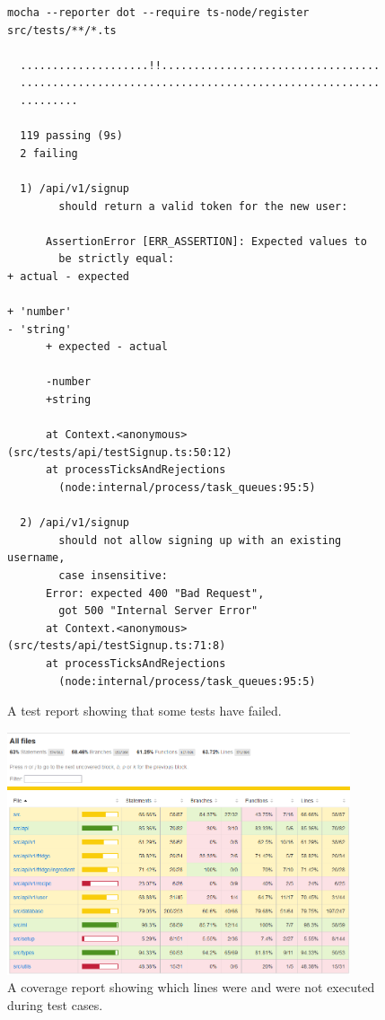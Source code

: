 \begin{figure}
  \centering
  \caption{\label{fig:test_report}A test report showing that some tests have failed.}
  \begin{verbatim}
mocha --reporter dot --require ts-node/register src/tests/**/*.ts

  ....................!!..................................
  ........................................................
  .........

  119 passing (9s)
  2 failing

  1) /api/v1/signup
        should return a valid token for the new user:

      AssertionError [ERR_ASSERTION]: Expected values to
        be strictly equal:
+ actual - expected

+ 'number'
- 'string'
      + expected - actual

      -number
      +string

      at Context.<anonymous> (src/tests/api/testSignup.ts:50:12)
      at processTicksAndRejections
        (node:internal/process/task_queues:95:5)

  2) /api/v1/signup
        should not allow signing up with an existing username,
        case insensitive:
      Error: expected 400 "Bad Request",
        got 500 "Internal Server Error"
      at Context.<anonymous> (src/tests/api/testSignup.ts:71:8)
      at processTicksAndRejections
        (node:internal/process/task_queues:95:5)
  \end{verbatim}
\end{figure}

\begin{figure}
  \centering
  \caption{\label{fig:coverage_report}A coverage report showing which lines were and were not executed during test cases.}
  \includegraphics[width=0.9\textwidth]{figures/coverage_report.png}
\end{figure}

